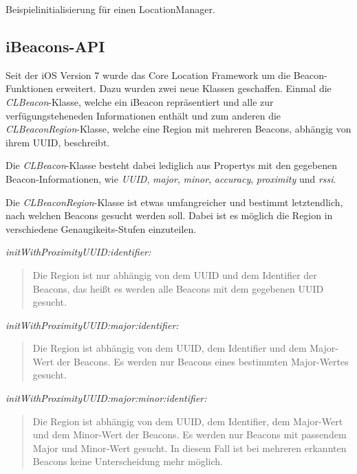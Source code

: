   \begin{listing}[htb!]
    \caption{Beispielinitialisierung für einen LocationManager.}
    \label{lst:locationmanager_objc}
  \end{listing}

\subsection{iBeacons-API}
\label{sec:technologies:corelocation:ibeaconsapi}
Seit der iOS Version 7 wurde das Core Location Framework um die Beacon-Funktionen erweitert. 
Dazu wurden zwei neue Klassen geschaffen. Einmal die \emph{CLBeacon}-Klasse, welche ein iBeacon repräsentiert und alle zur verfügungsteheneden Informationen enthält und zum anderen die \emph{CLBeaconRegion}-Klasse, welche eine Region mit mehreren Beacons, abhängig von ihrem UUID, beschreibt.

Die \emph{CLBeacon}-Klasse besteht dabei lediglich aus Propertys mit den gegebenen Beacon-Informationen, wie \emph{UUID}, \emph{major}, \emph{minor}, \emph{accuracy}, \emph{proximity} und \emph{rssi}.

Die \emph{CLBeaconRegion}-Klasse ist etwas umfangreicher und bestimmt letztendlich, nach welchen Beacons gesucht werden soll.
Dabei ist es möglich die Region in verschiedene Genaugikeits-Stufen einzuteilen.


\emph{initWithProximityUUID:identifier:}\begin{quote}
	Die Region ist nur abhängig von dem UUID und dem Identifier der Beacons, das heißt es werden alle Beacons mit dem gegebenen UUID gesucht.
\end{quote}
\emph{initWithProximityUUID:major:identifier:}\begin{quote}
	Die Region ist abhängig von dem UUID, dem Identifier und dem Major-Wert der Beacons. Es werden nur Beacons eines bestimmten Major-Wertes gesucht.
\end{quote}
\emph{initWithProximityUUID:major:minor:identifier:}\begin{quote}
	Die Region ist abhängig von dem UUID, dem Identifier, dem Major-Wert und dem Minor-Wert der Beacons. Es werden nur Beacons mit passendem Major und Minor-Wert gesucht. In diesem Fall ist bei mehreren erkannten Beacons keine Unterscheidung mehr möglich.
\end{quote}


